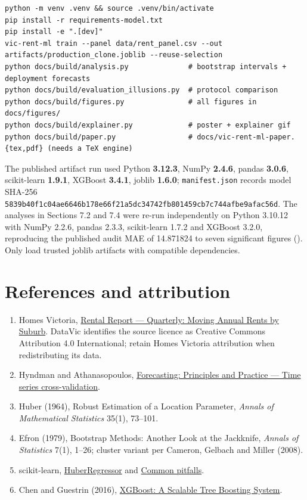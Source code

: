 \documentclass[11pt,a4paper]{article}
\begin{document}
\begin{lstlisting}
python -m venv .venv && source .venv/bin/activate
pip install -r requirements-model.txt
pip install -e ".[dev]"
vic-rent-ml train --panel data/rent_panel.csv --out artifacts/production_clone.joblib --reuse-selection
python docs/build/analysis.py              # bootstrap intervals + deployment forecasts
python docs/build/evaluation_illusions.py  # protocol comparison
python docs/build/figures.py               # all figures in docs/figures/
python docs/build/explainer.py             # poster + explainer gif
python docs/build/paper.py                 # docs/vic-rent-ml-paper.{tex,pdf} (needs a TeX engine)
\end{lstlisting}

The published artifact run used Python \textbf{3.12.3}, NumPy \textbf{2.4.6}, pandas \textbf{3.0.6}, scikit-learn \textbf{1.9.1}, XGBoost \textbf{3.4.1}, joblib \textbf{1.6.0}; \texttt{manifest.json} records model SHA-256 \texttt{5839b40f1c04ae6646b178e66f21a5dc34742fb801459cb7c744afbe9afac56d}. The analyses in Sections 7.2 and 7.4 were re-run independently on Python 3.10.12 with NumPy 2.2.6, pandas 2.3.3, scikit-learn 1.7.2 and XGBoost 3.2.0, reproducing the published audit MAE of 14.871824 to seven significant figures (). Only load trusted joblib artifacts with compatible dependencies.

\section{References and attribution}

\begin{enumerate}
\item Homes Victoria, \href{https://discover.data.vic.gov.au/dataset/rental-report-quarterly-moving-annual-rents-by-suburb}{Rental Report --- Quarterly: Moving Annual Rents by Suburb}. DataVic identifies the source licence as Creative Commons Attribution 4.0 International; retain Homes Victoria attribution when redistributing its data.
\item Hyndman and Athanasopoulos, \href{https://otexts.com/fpp3/tscv.html}{Forecasting: Principles and Practice --- Time series cross-validation}.
\item Huber (1964), Robust Estimation of a Location Parameter, \emph{Annals of Mathematical Statistics} 35(1), 73--101.
\item Efron (1979), Bootstrap Methods: Another Look at the Jackknife, \emph{Annals of Statistics} 7(1), 1--26; cluster variant per Cameron, Gelbach and Miller (2008).
\item scikit-learn, \href{https://scikit-learn.org/stable/modules/generated/sklearn.linear\_model.HuberRegressor.html}{HuberRegressor} and \href{https://scikit-learn.org/stable/common\_pitfalls.html}{Common pitfalls}.
\item Chen and Guestrin (2016), \href{https://doi.org/10.1145/2939672.2939785}{XGBoost: A Scalable Tree Boosting System}.
\end{enumerate}
\end{document}
